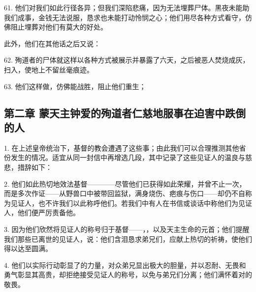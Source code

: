 61. 他们对我们如此行径各异；但我们深陷悲痛，因为无法埋葬尸体。黑夜未能助我们成事，金钱无法说服，恳求也未能打动怜悯之心；他们用尽各种方式看守，仿佛阻止埋葬对他们有莫大的好处。\par

此外，他们在其他话之后又说：\par

62. 殉道者的尸体就这样以各种方式被展示并暴露了六天，之后被恶人焚烧成灰，扫入，使地上不留丝毫痕迹。\par

63. 他们这样做，仿佛能战胜，阻止他们重生；\par


\subsection{第二章 蒙天主钟爱的殉道者仁慈地服事在迫害中跌倒的人}

1. 在上述皇帝统治下，基督的教会遭遇了这些事；由此我们可以合理推测其他省份发生的情况。适宜从同一封信中再增选几段，其中记录了这些见证人的温良与慈悲，措辞如下：\par

2. 他们如此热切地效法基督————尽管他们已获得如此荣耀，并曾不止一次，而是多次作证——从野兽口中被带回监狱，满身烧伤、疤痕与伤口——却仍不自称为见证人，也不许我们以此称呼他们。若我们中有人在书信或谈话中称他们为见证人，他们便严厉责备他。\par

3. 因为他们欣然将见证人的称号归于基督——，，以及天主生命的元首；他们提醒我们那些已离世的见证人，说：他们含泪恳求弟兄们，应献上热切的祈祷，使他们得以达至圆满。\par

4. 他们以实际行动彰显了的力量，对众弟兄显出极大的胆量，并以忍耐、无畏和勇气彰显其高贵，却拒绝接受见证人的称号，以免与弟兄们分离；他们满怀着对的敬畏。\par

